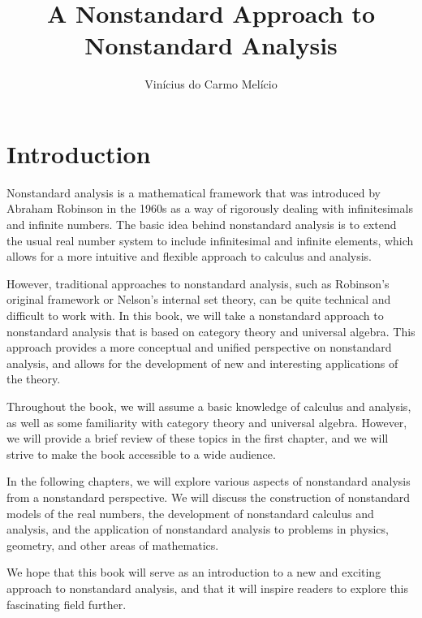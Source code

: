 \documentclass{book}
\title{A Nonstandard Approach to Nonstandard Analysis}
\author{Vinícius do Carmo Melício}
\date{}
\begin{document}
\maketitle

\tableofcontents

\chapter{Introduction}

Nonstandard analysis is a mathematical framework that was introduced by Abraham Robinson in the 1960s as a way of rigorously dealing with infinitesimals and infinite numbers. The basic idea behind nonstandard analysis is to extend the usual real number system to include infinitesimal and infinite elements, which allows for a more intuitive and flexible approach to calculus and analysis.

However, traditional approaches to nonstandard analysis, such as Robinson's original framework or Nelson's internal set theory, can be quite technical and difficult to work with. In this book, we will take a nonstandard approach to nonstandard analysis that is based on category theory and universal algebra. This approach provides a more conceptual and unified perspective on nonstandard analysis, and allows for the development of new and interesting applications of the theory.

Throughout the book, we will assume a basic knowledge of calculus and analysis, as well as some familiarity with category theory and universal algebra. However, we will provide a brief review of these topics in the first chapter, and we will strive to make the book accessible to a wide audience.

In the following chapters, we will explore various aspects of nonstandard analysis from a nonstandard perspective. We will discuss the construction of nonstandard models of the real numbers, the development of nonstandard calculus and analysis, and the application of nonstandard analysis to problems in physics, geometry, and other areas of mathematics.

We hope that this book will serve as an introduction to a new and exciting approach to nonstandard analysis, and that it will inspire readers to explore this fascinating field further.
\end{document}
